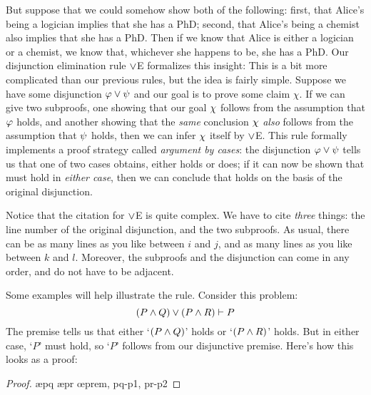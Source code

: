 But suppose that we could somehow show both of the following: first, that Alice's being a logician implies that she has a PhD; second, that Alice's being a chemist also implies that she has a PhD. Then if we know that Alice is either a logician or a chemist, we know that, whichever she happens to be, she has a PhD. Our disjunction elimination rule $\vee$E formalizes this insight:
This is a bit more complicated than our previous rules, but the idea is fairly simple. Suppose we have some disjunction $\mathcal{\varphi} \vee \mathcal{\psi}$ and our goal is to prove some claim $\chi$.  If we can give two subproofs, one showing that our goal $\mathcal{\chi}$ follows from the assumption that $\mathcal{\varphi}$ holds, and another showing that the \emph{same} conclusion $\mathcal{\chi}$ \emph{also} follows from the assumption that $\mathcal{\psi}$ holds, then we can infer $\mathcal{\chi}$ itself by $\vee$E. This rule formally implements a proof strategy called \emph{argument by cases}: the disjunction $\mathcal{\varphi} \vee \mathcal{\psi}$ tells us that one of two cases obtains, either \meta{\varphi} holds or \meta{\psi} does; if it can now be shown that \meta{\chi} must hold in \emph{either case}, then we can conclude that \meta{\chi} holds on the basis of the original disjunction.

Notice that the citation for $\vee$E is quite complex.  We have to cite \emph{three} things: the line number of the original disjunction, and the two subproofs.  As usual, there can be as many lines as you like between $i$ and $j$, and as many lines as you like between $k$ and $l$. Moreover, the subproofs and the disjunction can come in any order, and do not have to be adjacent.

Some examples will help illustrate the rule. Consider this problem:
$$(P \wedge Q) \vee (P \wedge R) \vdash P$$
The premise tells us that either `$(P \wedge Q)$' holds or `$(P \wedge R)$' holds.  But in either case, `$P$' must hold, so `$P$' follows from our disjunctive premise.  Here's how this looks as a proof:
	\begin{proof}
			\open
				 
				\ae{pq}
			\close
			\open
				 
				\ae{pr}
			\close
		\oe{prem, pq-p1, pr-p2}
	\end{proof}


